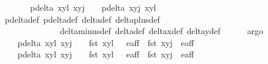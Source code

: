 \begin{isabellebody}
\ \ \ \ \ \ \ {\isachardoublequoteopen}{\isacharparenleft}p{\isacharunderscore}delta{\isacharprime}\ {\isacharparenleft}{\isacharparenleft}x{}{\isacharcomma}y{}{\isacharparenright}{\isacharcomma}l{\isacharparenright}\ {\isacharparenleft}{\isacharparenleft}x{}{\isacharcomma}y{}{\isacharparenright}{\isacharcomma}j{\isacharparenright}\ {\isasymnoteq}\ {}{\isacharparenright}\ {\isacharequal}\ {\isacharparenleft}p{\isacharunderscore}delta{\isacharprime}\ {\isacharparenleft}{\isacharparenleft}x{}{\isacharcomma}y{}{\isacharparenright}{\isacharcomma}j{\isacharparenright}\ {\isacharparenleft}{\isacharparenleft}x{}{\isacharcomma}y{}{\isacharparenright}{\isacharcomma}l{\isacharparenright}\ {\isasymnoteq}\ {}{\isacharparenright}{\isachardoublequoteclose}\isanewline
\ \ \ \ \isamarkupfalse%
\ p{\isacharunderscore}delta{\isacharunderscore}def\ p{\isacharunderscore}delta{\isacharprime}{\isacharunderscore}def\ delta{\isacharunderscore}def\ delta{\isacharunderscore}plus{\isacharunderscore}def\ \isanewline
\ \ \ \ \ \ \ \ \ \ \ \ \ \ delta{\isacharunderscore}minus{\isacharunderscore}def\ delta{\isacharprime}{\isacharunderscore}def\ delta{\isacharunderscore}x{\isacharunderscore}def\ delta{\isacharunderscore}y{\isacharunderscore}def\isanewline
\ \ \ \ \isamarkupfalse%
\ argo{\isacharplus}\isanewline
\ \ \isamarkupfalse%
\ \isanewline
\ \ \ {\isacharparenleft}{}{\isacharparenright}\ {\isachardoublequoteopen}p{\isacharunderscore}delta\ {\isacharparenleft}{\isacharparenleft}x{}{\isacharcomma}y{}{\isacharparenright}{\isacharcomma}l{\isacharparenright}\ {\isacharparenleft}{\isacharparenleft}x{}{\isacharcomma}y{}{\isacharparenright}{\isacharcomma}j{\isacharparenright}\ {\isasymnoteq}\ {}\ {\isasymand}\ fst\ {\isacharparenleft}{\isacharparenleft}x{}{\isacharcomma}y{}{\isacharparenright}{\isacharcomma}l{\isacharparenright}\ \ {\isasymin}\ e{\isacharunderscore}aff\ {\isasymand}\ fst\ {\isacharparenleft}{\isacharparenleft}x{}{\isacharcomma}y{}{\isacharparenright}{\isacharcomma}j{\isacharparenright}\ {\isasymin}\ e{\isacharunderscore}aff{\isachardoublequoteclose}\ {\isacharbar}\isanewline
\ \ \ {\isacharparenleft}{}{\isacharparenright}\ {\isachardoublequoteopen}p{\isacharunderscore}delta{\isacharprime}\ {\isacharparenleft}{\isacharparenleft}x{}{\isacharcomma}y{}{\isacharparenright}{\isacharcomma}l{\isacharparenright}\ {\isacharparenleft}{\isacharparenleft}x{}{\isacharcomma}y{}{\isacharparenright}{\isacharcomma}j{\isacharparenright}\ {\isasymnoteq}\ {}\ {\isasymand}\ fst\ {\isacharparenleft}{\isacharparenleft}x{}{\isacharcomma}y{}{\isacharparenright}{\isacharcomma}l{\isacharparenright}\ \ {\isasymin}\ e{\isacharunderscore}aff\ {\isasymand}\ fst\ {\isacharparenleft}{\isacharparenleft}x{}{\isacharcomma}y{}{\isacharparenright}{\isacharcomma}j{\isacharparenright}\ {\isasymin}\ e{\isacharunderscore}aff{\isachardoublequoteclose}\ {\isacharbar}\isanewline

\end{isabellebody}
